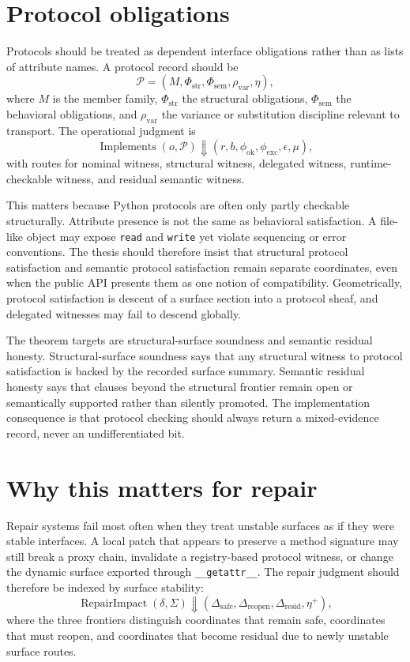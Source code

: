 \documentclass[11pt]{report}
\begin{document}
\section{Protocol obligations}
Protocols should be treated as dependent interface obligations rather than as lists of attribute names. A protocol record should be
\[
\mathcal{P} = (M,\Phi_{\mathrm{str}},\Phi_{\mathrm{sem}},\rho_{\mathrm{var}},\eta),
\]
where $M$ is the member family, $\Phi_{\mathrm{str}}$ the structural obligations, $\Phi_{\mathrm{sem}}$ the behavioral obligations, and $\rho_{\mathrm{var}}$ the variance or substitution discipline relevant to transport. The operational judgment is
\[
\operatorname{Implements}(o,\mathcal{P}) \Downarrow (r,b,\phi_{\mathrm{ok}},\phi_{\mathrm{exc}},\epsilon,\mu),
\]
with routes for nominal witness, structural witness, delegated witness, runtime-checkable witness, and residual semantic witness.

This matters because Python protocols are often only partly checkable structurally. Attribute presence is not the same as behavioral satisfaction. A file-like object may expose \texttt{read} and \texttt{write} yet violate sequencing or error conventions. The thesis should therefore insist that structural protocol satisfaction and semantic protocol satisfaction remain separate coordinates, even when the public API presents them as one notion of compatibility. Geometrically, protocol satisfaction is descent of a surface section into a protocol sheaf, and delegated witnesses may fail to descend globally.

The theorem targets are structural-surface soundness and semantic residual honesty. Structural-surface soundness says that any structural witness to protocol satisfaction is backed by the recorded surface summary. Semantic residual honesty says that clauses beyond the structural frontier remain open or semantically supported rather than silently promoted. The implementation consequence is that protocol checking should always return a mixed-evidence record, never an undifferentiated bit.
\section{Why this matters for repair}
Repair systems fail most often when they treat unstable surfaces as if they were stable interfaces. A local patch that appears to preserve a method signature may still break a proxy chain, invalidate a registry-based protocol witness, or change the dynamic surface exported through \texttt{\_\_getattr\_\_}. The repair judgment should therefore be indexed by surface stability:
\[
\operatorname{RepairImpact}(\delta,\Sigma) \Downarrow (\Delta_{\mathrm{safe}},\Delta_{\mathrm{reopen}},\Delta_{\mathrm{resid}},\eta^{+}),
\]
where the three frontiers distinguish coordinates that remain safe, coordinates that must reopen, and coordinates that become residual due to newly unstable surface routes.
\end{document}
